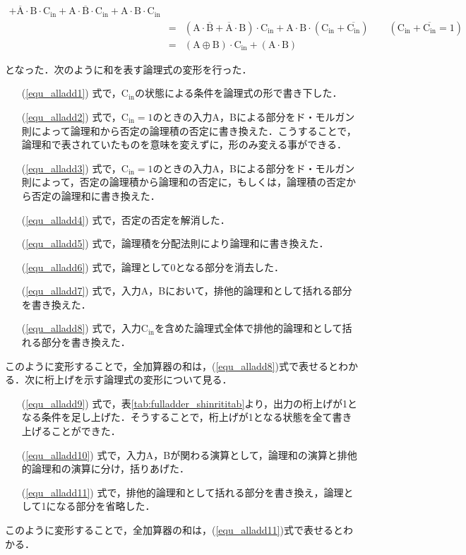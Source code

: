 \begin{eqnarray}
		+	\overline{\mathrm{A}} \cdot \mathrm{B} \cdot \mathrm{C_{in}}
		+	\mathrm{A} \cdot \overline{\mathrm{B}} \cdot \mathrm{C_{in}}
		+	\mathrm{A} \cdot \mathrm{B} \cdot \mathrm{C_{in}}
		\label{equ_alladd9} \\
	&=&	
		(
			\mathrm{A} \cdot \overline{\mathrm{B}}+
			\overline{\mathrm{A}} \cdot \mathrm{B} 
		)
			\cdot \mathrm{C_{in}}
		+	\mathrm{A} \cdot \mathrm{B} \cdot 
		(
			\mathrm{C_{in}}
			+
			\overline{\mathrm{C_{in}}}
		)
		\qquad
		( \mathrm{C_{in}} + \overline{\mathrm{C_{in}}} = 1 )
		\label{equ_alladd10} \\
	&=& ( \mathrm{A} \oplus \mathrm{B} ) \cdot \mathrm{C_{in}} + ( \mathrm{A} \cdot \mathrm{B} )\label{equ_alladd11} 
\end{eqnarray}

となった．次のように和を表す論理式の変形を行った．
\begin{itemize}
	\item [(\ref{equ_alladd1})]式で，$\mathrm{C_{in}}$の状態による条件を論理式の形で書き下した．
	\item [(\ref{equ_alladd2})]式で，$\mathrm{C_{in}}=1$のときの入力A，Bによる部分をド・モルガン則によって論理和から否定の論理積の否定に書き換えた．こうすることで，論理和で表されていたものを意味を変えずに，形のみ変える事ができる．
	\item [(\ref{equ_alladd3})]式で，$\mathrm{C_{in}}=1$のときの入力A，Bによる部分をド・モルガン則によって，否定の論理積から論理和の否定に，もしくは，論理積の否定から否定の論理和に書き換えた．
	\item [(\ref{equ_alladd4})]式で，否定の否定を解消した．
	\item [(\ref{equ_alladd5})]式で，論理積を分配法則により論理和に書き換えた．
	\item [(\ref{equ_alladd6})]式で，論理として0となる部分を消去した．
	\item [(\ref{equ_alladd7})]式で，入力A，Bにおいて，排他的論理和として括れる部分を書き換えた．
	\item [(\ref{equ_alladd8})]式で，入力$\mathrm{C_{in}}$を含めた論理式全体で排他的論理和として括れる部分を書き換えた．
\end{itemize}
このように変形することで，全加算器の和は，(\ref{equ_alladd8})式で表せるとわかる．次に桁上げを示す論理式の変形について見る．
\begin{itemize}
	\item [(\ref{equ_alladd9})]式で，表\ref{tab:fulladder_shinrititab}より，出力の桁上げが1となる条件を足し上げた．そうすることで，桁上げが1となる状態を全て書き上げることができた．
	\item [(\ref{equ_alladd10})]式で，入力A，Bが関わる演算として，論理和の演算と排他的論理和の演算に分け，括りあげた．
	\item [(\ref{equ_alladd11})]式で，排他的論理和として括れる部分を書き換え，論理として1になる部分を省略した．
\end{itemize}
このように変形することで，全加算器の和は，(\ref{equ_alladd11})式で表せるとわかる．


